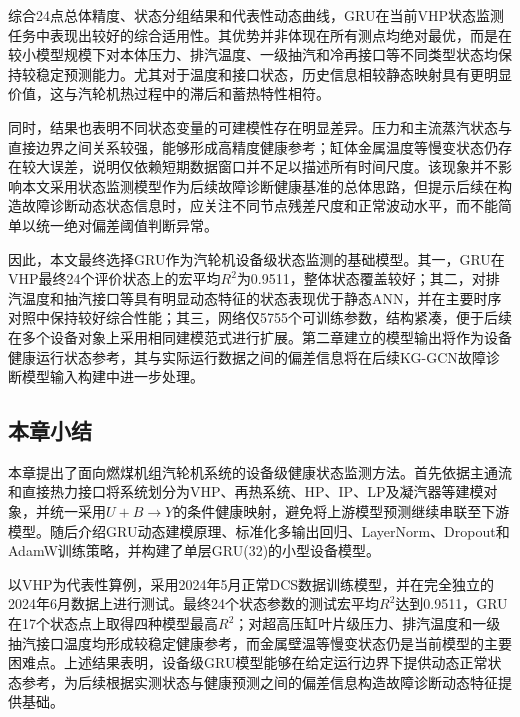 综合24点总体精度、状态分组结果和代表性动态曲线，GRU在当前VHP状态监测任务中表现出较好的综合适用性。其优势并非体现在所有测点均绝对最优，而是在较小模型规模下对本体压力、排汽温度、一级抽汽和冷再接口等不同类型状态均保持较稳定预测能力。尤其对于温度和接口状态，历史信息相较静态映射具有更明显价值，这与汽轮机热过程中的滞后和蓄热特性相符。

同时，结果也表明不同状态变量的可建模性存在明显差异。压力和主流蒸汽状态与直接边界之间关系较强，能够形成高精度健康参考；缸体金属温度等慢变状态仍存在较大误差，说明仅依赖短期数据窗口并不足以描述所有时间尺度。该现象并不影响本文采用状态监测模型作为后续故障诊断健康基准的总体思路，但提示后续在构造故障诊断动态状态信息时，应关注不同节点残差尺度和正常波动水平，而不能简单以统一绝对偏差阈值判断异常。

因此，本文最终选择GRU作为汽轮机设备级状态监测的基础模型。其一，GRU在VHP最终24个评价状态上的宏平均$R^2$为0.9511，整体状态覆盖较好；其二，对排汽温度和抽汽接口等具有明显动态特征的状态表现优于静态ANN，并在主要时序对照中保持较好综合性能；其三，网络仅5755个可训练参数，结构紧凑，便于后续在多个设备对象上采用相同建模范式进行扩展。第二章建立的模型输出将作为设备健康运行状态参考，其与实际运行数据之间的偏差信息将在后续KG-GCN故障诊断模型输入构建中进一步处理。

\subsection{本章小结}

本章提出了面向燃煤机组汽轮机系统的设备级健康状态监测方法。首先依据主通流和直接热力接口将系统划分为VHP、再热系统、HP、IP、LP及凝汽器等建模对象，并统一采用$U+B\rightarrow Y$的条件健康映射，避免将上游模型预测继续串联至下游模型。随后介绍GRU动态建模原理、标准化多输出回归、LayerNorm、Dropout和AdamW训练策略，并构建了单层GRU(32)的小型设备模型。

以VHP为代表性算例，采用2024年5月正常DCS数据训练模型，并在完全独立的2024年6月数据上进行测试。最终24个状态参数的测试宏平均$R^2$达到0.9511，GRU在17个状态点上取得四种模型最高$R^2$；对超高压缸叶片级压力、排汽温度和一级抽汽接口温度均形成较稳定健康参考，而金属壁温等慢变状态仍是当前模型的主要困难点。上述结果表明，设备级GRU模型能够在给定运行边界下提供动态正常状态参考，为后续根据实测状态与健康预测之间的偏差信息构造故障诊断动态特征提供基础。